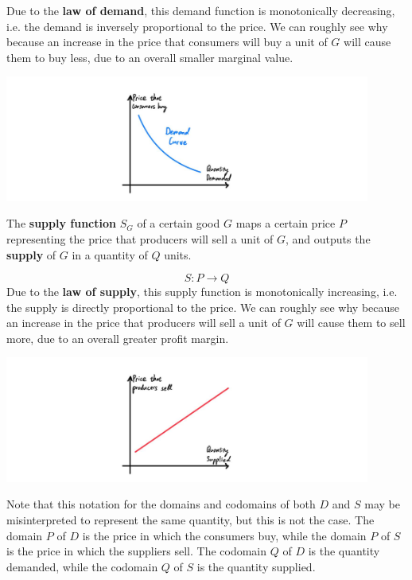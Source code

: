 \documentclass{article}
\begin{document}
    Due to the \textbf{law of demand}, this demand function is monotonically decreasing, i.e. the demand is inversely proportional to the price. We can roughly see why because an increase in the price that consumers will buy a unit of $G$ will cause them to buy less, due to an overall smaller marginal value.
    \begin{center}
      \includegraphics[width=0.9\textwidth]{img/Demand_Curve.jpg}
    \end{center}

    The \textbf{supply function} $S_G$ of a certain good $G$ maps a certain price $P$ representing the price that producers will sell a unit of $G$, and outputs the \textbf{supply} of $G$ in a quantity of $Q$ units.

    \begin{equation}
      S: P \longrightarrow Q
    \end{equation}
    Due to the \textbf{law of supply}, this supply function is monotonically increasing, i.e. the supply is directly proportional to the price. We can roughly see why because an increase in the price that producers will sell a unit of $G$ will cause them to sell more, due to an overall greater profit margin.

    \begin{center}
      \includegraphics[width=0.9\textwidth]{img/Supply_Curve.jpg}
    \end{center}
    Note that this notation for the domains and codomains of both $D$ and $S$ may be misinterpreted to represent the same quantity, but this is not the case. The domain $P$ of $D$ is the price in which the consumers buy, while the domain $P$ of $S$ is the price in which the suppliers sell. The codomain $Q$ of $D$ is the quantity demanded, while the codomain $Q$ of $S$ is the quantity supplied.
\end{document}
